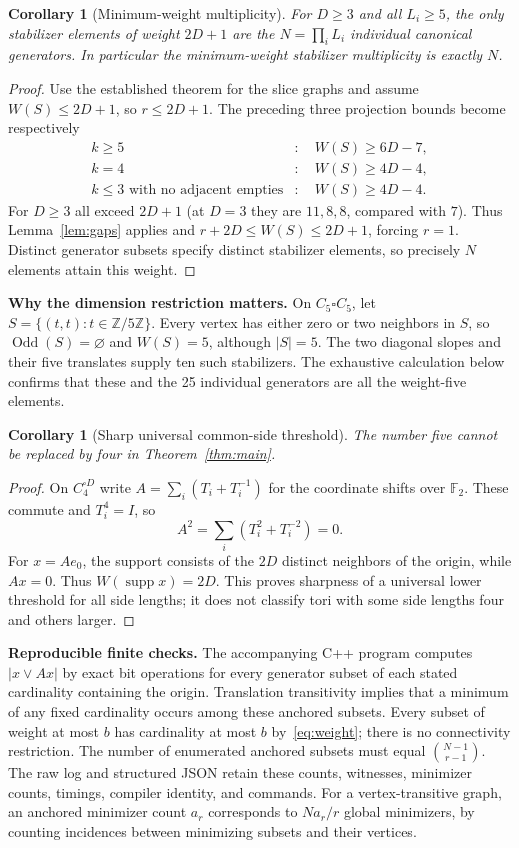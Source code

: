 \documentclass[10pt]{article}
\newtheorem{corollary}[theorem]{Corollary}
\newcommand{\Odd}{\operatorname{Odd}}
\newcommand{\supp}{\operatorname{supp}}
\newcommand{\F}{\mathbb F_2}
\begin{document}
\begin{corollary}[Minimum-weight multiplicity]\label{cor:unique}
For $D\ge3$ and all $L_i\ge5$, the only stabilizer elements of weight $2D+1$ are the $N=\prod_i L_i$ individual canonical generators. In particular the minimum-weight stabilizer multiplicity is exactly $N$.
\end{corollary}
\begin{proof}
Use the established theorem for the slice graphs and assume $W(S)\le2D+1$, so $r\le2D+1$. The preceding three projection bounds become respectively
\[
\begin{aligned}
 k\ge5 &:\quad W(S)\ge6D-7,\\
 k=4 &:\quad W(S)\ge4D-4,\\
 k\le3\text{ with no adjacent empties} &:\quad W(S)\ge4D-4.
\end{aligned}
\]
For $D\ge3$ all exceed $2D+1$ (at $D=3$ they are $11,8,8$, compared with $7$). Thus Lemma~\ref{lem:gaps} applies and $r+2D\le W(S)\le2D+1$, forcing $r=1$. Distinct generator subsets specify distinct stabilizer elements, so precisely $N$ elements attain this weight.
\end{proof}

\noindent\textbf{Why the dimension restriction matters.}
On $C_5\square C_5$, let $S=\{(t,t):t\in\mathbb Z/5\mathbb Z\}$. Every vertex has either zero or two neighbors in $S$, so $\Odd(S)=\varnothing$ and $W(S)=5$, although $|S|=5$. The two diagonal slopes and their five translates supply ten such stabilizers. The exhaustive calculation below confirms that these and the 25 individual generators are all the weight-five elements.

\begin{corollary}[Sharp universal common-side threshold]
The number five cannot be replaced by four in Theorem~\ref{thm:main}.
\end{corollary}
\begin{proof}
On $C_4^{\square D}$ write $A=\sum_i(T_i+T_i^{-1})$ for the coordinate shifts over $\F$. These commute and $T_i^4=I$, so
\[
 A^2=\sum_i(T_i^2+T_i^{-2})=0.
\]
For $x=Ae_0$, the support consists of the $2D$ distinct neighbors of the origin, while $Ax=0$. Thus $W(\supp x)=2D$. This proves sharpness of a universal lower threshold for all side lengths; it does not classify tori with some side lengths four and others larger.
\end{proof}

\noindent\textbf{Reproducible finite checks.}
The accompanying C++ program computes $|x\lor Ax|$ by exact bit operations for every generator subset of each stated cardinality containing the origin. Translation transitivity implies that a minimum of any fixed cardinality occurs among these anchored subsets. Every subset of weight at most $b$ has cardinality at most $b$ by~\eqref{eq:weight}; there is no connectivity restriction. The number of enumerated anchored subsets must equal $\binom{N-1}{r-1}$. The raw log and structured JSON retain these counts, witnesses, minimizer counts, timings, compiler identity, and commands. For a vertex-transitive graph, an anchored minimizer count $a_r$ corresponds to $Na_r/r$ global minimizers, by counting incidences between minimizing subsets and their vertices.
\end{document}
